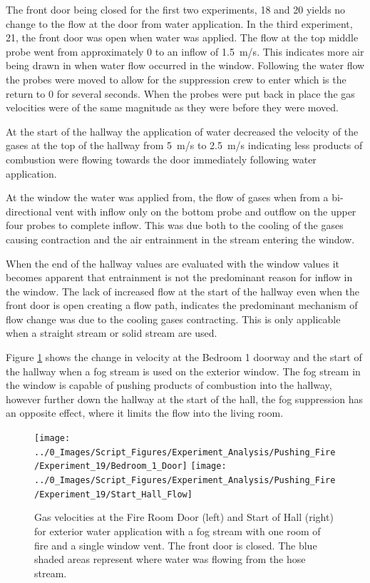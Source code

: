 \documentclass[12pt,oneside]{book}
\begin{document}
The front door being closed for the first two experiments, 18 and 20 yields no change to the flow at the door from water application. In the third experiment, 21, the front door was open when water was applied. The flow at the top middle probe went from approximately 0 to an inflow of 1.5~m/s. This indicates more air being drawn in when water flow occurred in the window. Following the water flow the probes were moved to allow for the suppression crew to enter which is the return to 0 for several seconds. When the probes were put back in place the gas velocities were of the same magnitude as they were before they were moved. 

At the start of the hallway the application of water decreased the velocity of the gases at the top of the hallway from 5~m/s to 2.5~m/s indicating less products of combustion were flowing towards the door immediately following water application.

At the window the water was applied from, the flow of gases when from a bi-directional vent with inflow only on the bottom probe and outflow on the upper four probes to complete inflow. This was due both to the cooling of the gases causing contraction and the air entrainment in the stream entering the window. 

When the end of the hallway values are evaluated with the window values it becomes apparent that entrainment is not the predominant reason for inflow in the window. The lack of increased flow at the start of the hallway even when the front door is open creating a flow path, indicates the predominant mechanism of flow change was due to the cooling gases contracting. This is only applicable when a straight stream or solid stream are used. 

Figure \ref{fig:push_fire_dead_end_fog} shows the change in velocity at the Bedroom 1 doorway and the start of the hallway when a fog stream is used on the exterior window.  The fog stream in the window is capable of pushing products of combustion into the hallway, however further down the hallway at the start of the hall, the fog suppression has an opposite effect, where it limits the flow into the living room. 

\begin{figure}[H]
\centering
\texttt{[image: ../0\_Images/Script\_Figures/Experiment\_Analysis/Pushing\_Fire/Experiment\_19/Bedroom\_1\_Door]}
\texttt{[image: ../0\_Images/Script\_Figures/Experiment\_Analysis/Pushing\_Fire/Experiment\_19/Start\_Hall\_Flow]}
\caption[Gas Velocities - Single Room of Fire - Exterior Fog]{Gas velocities at the Fire Room Door (left) and Start of Hall (right) for exterior water application with a fog stream with one room of fire and a single window vent. The front door is closed. The blue shaded areas represent where water was flowing from the hose stream.}
\label{fig:push_fire_dead_end_fog}
\end{figure}
\end{document}
